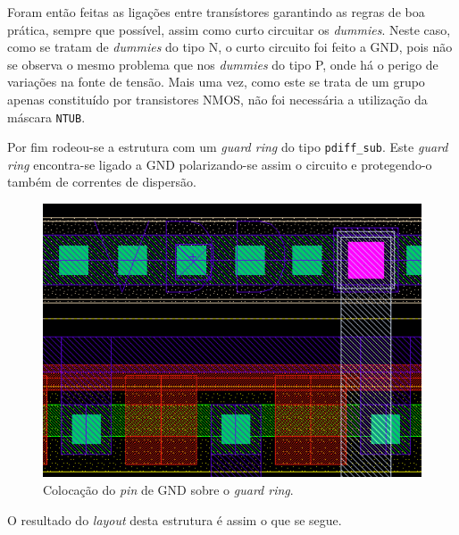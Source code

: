 \documentclass[11pt]{article}
\numberwithin{equation}{section}
\begin{document}
Foram então feitas as ligações entre transístores garantindo as regras de boa prática, sempre que possível, assim como curto circuitar os \textit{dummies}. Neste caso, como se tratam de \textit{dummies} do tipo N, o curto circuito foi feito a GND, pois não se observa o mesmo problema que nos \textit{dummies} do tipo P, onde há o perigo de variações na fonte de tensão. Mais uma vez, como este se trata de um grupo apenas constituído por transistores NMOS, não foi necessária a utilização da máscara \texttt{NTUB}.

Por fim rodeou-se a estrutura com um \textit{guard ring} do tipo \texttt{pdiff\_sub}. Este \textit{guard ring} encontra-se ligado a GND polarizando-se assim o circuito e protegendo-o também de correntes de dispersão. 

\begin{figure}[H]
	\centering
	\includegraphics[keepaspectratio=true, scale=0.25]{exps/layout/pinVDD}
	\vspace{-0.5em}
	\caption{Colocação do \textit{pin} de GND sobre o \textit{guard ring}.}
	\vspace{-0.8em}
\end{figure}


O resultado do \textit{layout} desta estrutura é assim o que se segue.
\end{document}
